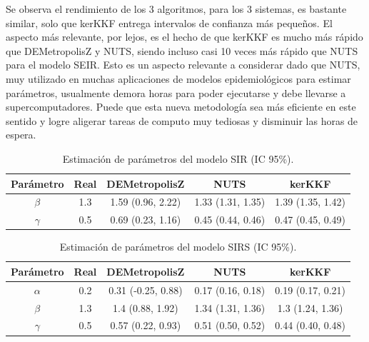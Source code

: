 Se observa el rendimiento de los 3 algoritmos, para los 3 sistemas, es bastante similar, solo que kerKKF entrega intervalos de confianza más pequeños. El aspecto más relevante, por lejos, es el hecho de que kerKKF es mucho más rápido que DEMetropolisZ y NUTS, siendo incluso casi 10 veces más rápido que NUTS para el modelo SEIR. Esto es un aspecto relevante a considerar dado que NUTS, muy utilizado en muchas aplicaciones de modelos epidemiológicos para estimar parámetros, usualmente demora horas para poder ejecutarse y debe llevarse a supercomputadores. Puede que esta nueva metodología sea más eficiente en este sentido y logre aligerar tareas de computo muy tediosas y disminuir las horas de espera.

\begin{table}[h!]
    \centering
    \caption{Estimación de parámetros del modelo SIR (IC 95\%).} 
    \begin{tabular}{|c|c|c|c|c|}
    \hline
    \textbf{Parámetro} & \textbf{Real} & \textbf{DEMetropolisZ} & \textbf{NUTS} & \textbf{kerKKF}  \\ \hline
    $\beta$ & 1.3 & 1.59 (0.96, 2.22) & 1.33 (1.31, 1.35) & 1.39 (1.35, 1.42) \\ \hline
    $\gamma$ & 0.5 & 0.69 (0.23, 1.16) & 0.45 (0.44, 0.46) & 0.47 (0.45, 0.49) \\ \hline
    \end{tabular}
    \label{tab:SIR_params}
\end{table}

\begin{table}[h!]
    \centering
    \caption{Estimación de parámetros del modelo SIRS (IC 95\%).} 
    \begin{tabular}{|c|c|c|c|c|}
    \hline
    \textbf{Parámetro}& \textbf{Real} & \textbf{DEMetropolisZ} & \textbf{NUTS} & \textbf{kerKKF}  \\ \hline
    $\alpha$ & 0.2 & 0.31 (-0.25, 0.88) & 0.17 (0.16, 0.18) & 0.19 (0.17, 0.21) \\ \hline
    $\beta$ & 1.3 & 1.4 (0.88, 1.92) & 1.34 (1.31, 1.36) & 1.3 (1.24, 1.36) \\ \hline
    $\gamma$ & 0.5 & 0.57 (0.22, 0.93) & 0.51 (0.50, 0.52) & 0.44 (0.40, 0.48) \\ \hline
    \end{tabular}
    \label{tab:SIRS_params}
\end{table}

